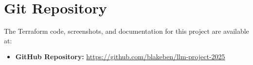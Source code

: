 \documentclass[10pt]{article}
\begin{document}
\section*{Git Repository}
The Terraform code, screenshots, and documentation for this project are available at:
\begin{itemize}
    \item \textbf{GitHub Repository:} \url{https://github.com/blakeben/llm-project-2025}
\end{itemize}
\end{document}

